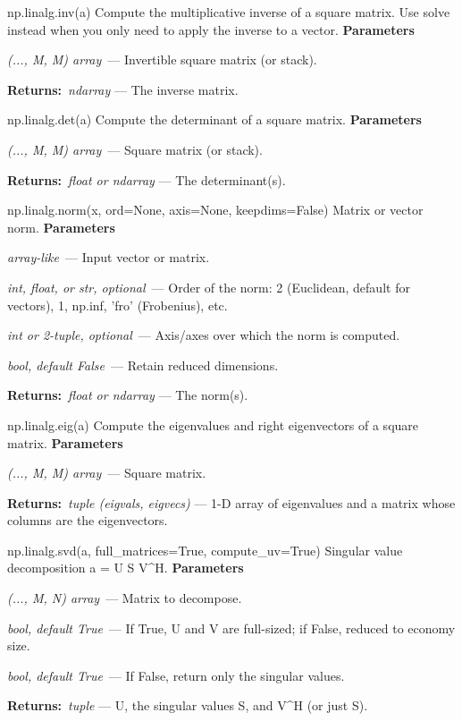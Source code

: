 \documentclass[10pt]{article}
\newenvironment{params}
  {\smallskip\textbf{\small\color{accent}Parameters}\par\nopagebreak
   \begin{description}[leftmargin=1.3em,itemsep=1.5pt,parsep=0pt,topsep=1pt,
      labelindent=0pt,style=sameline,font=\normalfont]}
  {\end{description}}
\newcommand{\pitem}[3]{\item[{\ttfamily\color{accent}#1}]{\itshape #2}\ --- #3}
\newcommand{\preturn}[2]{\smallskip\textbf{\small\color{accent}Returns:}\ {\itshape #1} --- #2\par}
\begin{document}
\begin{func}{np.linalg.inv(a)}
Compute the multiplicative inverse of a square matrix. Use solve instead when you only need to apply the inverse to a vector.
\begin{params}
\pitem{a}{(..., M, M) array}{Invertible square matrix (or stack).}
\end{params}
\preturn{ndarray}{The inverse matrix.}
\end{func}
\medskip

\begin{func}{np.linalg.det(a)}
Compute the determinant of a square matrix.
\begin{params}
\pitem{a}{(..., M, M) array}{Square matrix (or stack).}
\end{params}
\preturn{float or ndarray}{The determinant(s).}
\end{func}
\medskip

\begin{func}{np.linalg.norm(x, ord=None, axis=None, keepdims=False)}
Matrix or vector norm.
\begin{params}
\pitem{x}{array-like}{Input vector or matrix.}
\pitem{ord}{int, float, or str, optional}{Order of the norm: 2 (Euclidean, default for vectors), 1, np.inf, 'fro' (Frobenius), etc.}
\pitem{axis}{int or 2-tuple, optional}{Axis/axes over which the norm is computed.}
\pitem{keepdims}{bool, default False}{Retain reduced dimensions.}
\end{params}
\preturn{float or ndarray}{The norm(s).}
\end{func}
\medskip

\begin{func}{np.linalg.eig(a)}
Compute the eigenvalues and right eigenvectors of a square matrix.
\begin{params}
\pitem{a}{(..., M, M) array}{Square matrix.}
\end{params}
\preturn{tuple (eigvals, eigvecs)}{1-D array of eigenvalues and a matrix whose columns are the eigenvectors.}
\end{func}
\medskip

\begin{func}{np.linalg.svd(a, full\_matrices=True, compute\_uv=True)}
Singular value decomposition a = U S V\textasciicircum{}H.
\begin{params}
\pitem{a}{(..., M, N) array}{Matrix to decompose.}
\pitem{full\_matrices}{bool, default True}{If True, U and V are full-sized; if False, reduced to economy size.}
\pitem{compute\_uv}{bool, default True}{If False, return only the singular values.}
\end{params}
\preturn{tuple}{U, the singular values S, and V\textasciicircum{}H (or just S).}
\end{func}
\medskip
\end{document}
